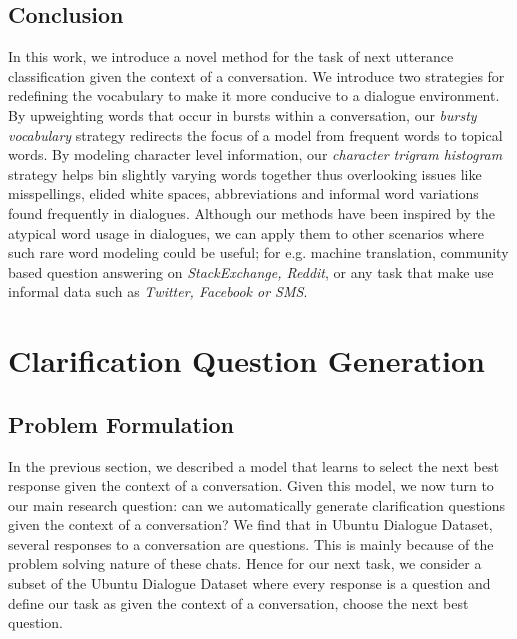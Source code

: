 \documentclass[11pt]{report}
\begin{document}
\subsection{Conclusion}
In this work, we introduce a novel method for the task of next utterance classification given the context of a conversation. We introduce two strategies for redefining the vocabulary to make it more conducive to a dialogue environment. By upweighting words that occur in bursts within a conversation, our \textit{bursty vocabulary} strategy redirects the focus of a model from frequent words to topical words. By modeling character level information, our \textit{character trigram histogram} strategy helps bin slightly varying words together thus overlooking issues like misspellings, elided white spaces, abbreviations and informal word variations found frequently in dialogues. Although our methods have been inspired by the atypical word usage in dialogues, we can apply them to other scenarios where such rare word modeling could be useful; for e.g. machine translation, community based question answering on \textit{StackExchange, Reddit}, or any task that make use informal data such as \textit{Twitter, Facebook or SMS}.\\

\section{Clarification Question Generation}

\subsection{Problem Formulation}
In the previous section, we described a model that learns to select the next best response given the context of a conversation. Given this model, we now turn to our main research question: can we automatically generate clarification questions given the context of a conversation? We find that in Ubuntu Dialogue Dataset, several responses to a conversation are questions. This is mainly because of the problem solving nature of these chats. Hence for our next task, we consider a subset of the Ubuntu Dialogue Dataset where every response is a question and define our task as given the context of a conversation, choose the next best question. 
\end{document}
